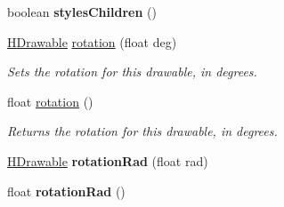 \begin{DoxyCompactItemize}
\item 
\hypertarget{classhype_1_1core_1_1drawable_1_1_h_drawable_af6f37964d79fcad3c3f2d011e8f44f9d}{boolean {\bfseries styles\-Children} ()}\label{classhype_1_1core_1_1drawable_1_1_h_drawable_af6f37964d79fcad3c3f2d011e8f44f9d}

\item 
\hyperlink{classhype_1_1core_1_1drawable_1_1_h_drawable}{H\-Drawable} \hyperlink{classhype_1_1core_1_1drawable_1_1_h_drawable_a87f1d8b6e7108e5229b6b9cb5eaf45a5}{rotation} (float deg)
\begin{DoxyCompactList}\small\item\em Sets the rotation for this drawable, in degrees. \end{DoxyCompactList}\item 
float \hyperlink{classhype_1_1core_1_1drawable_1_1_h_drawable_a9cfc2146ce028c14a1063ff77d88fb6e}{rotation} ()
\begin{DoxyCompactList}\small\item\em Returns the rotation for this drawable, in degrees. \end{DoxyCompactList}\item 
\hypertarget{classhype_1_1core_1_1drawable_1_1_h_drawable_a2a52c76cb32def1904a540e0bc25cf69}{\hyperlink{classhype_1_1core_1_1drawable_1_1_h_drawable}{H\-Drawable} {\bfseries rotation\-Rad} (float rad)}\label{classhype_1_1core_1_1drawable_1_1_h_drawable_a2a52c76cb32def1904a540e0bc25cf69}

\item 
\hypertarget{classhype_1_1core_1_1drawable_1_1_h_drawable_a3950c94397be45408d68ab1c2017d062}{float {\bfseries rotation\-Rad} ()}\label{classhype_1_1core_1_1drawable_1_1_h_drawable_a3950c94397be45408d68ab1c2017d062}


\end{DoxyCompactItemize}

